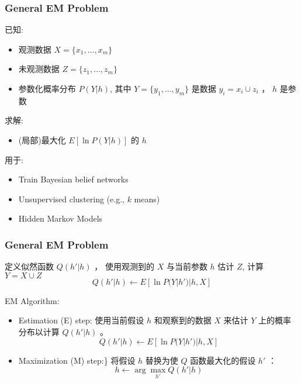 \documentclass{beamer}
\begin{document}
\begin{frame}
\frametitle{General  EM Problem}
\label{sec-9-7}


已知:
\begin{itemize}
\item 观测数据 $X=\{x_1, \ldots, x_m\}$
\item 未观测数据 $Z=\{z_1, \dots, z_m\}$
\item 参数化概率分布 $P(Y|h)$, 其中  $Y=\{y_1, \dots, y_m\}$ 是数据 $y_i = x_i \cup z_i$ ，  $h$ 是参数
\end{itemize}

求解:
\begin{itemize}
\item (局部)最大化 $E[\ln P(Y|h)]$ 的 $h$
\end{itemize}


用于:
\begin{itemize}
\item Train Bayesian belief networks
\item Unsupervised clustering (e.g., $k$ means)
\item Hidden Markov Models
\end{itemize}
\end{frame}
\begin{frame}
\frametitle{General  EM Problem}
\label{sec-9-8}

定义似然函数 $Q(h' | h)$ ， 使用观测到的 $X$ 与当前参数 $h$ 估计 $Z$, 计算 $Y = X \cup Z$
$$Q(h' | h) \leftarrow E[ \ln P(Y | h') | h, X ]$$

EM Algorithm:

\begin{itemize}
\item Estimation (E) step: 
    使用当前假设 $h$ 和观察到的数据 $X$ 来估计 $Y$ 上的概率分布以计算 $Q(h'|h)$ 。
    $$Q(h' | h) \leftarrow E[ \ln P(Y | h') | h, X ]$$
\item Maximization (M) step:\} 
    将假设 $h$ 替换为使 $Q$ 函数最大化的假设 $h'$ ：
    $$h \leftarrow \arg \max_{h'}  Q(h' | h)$$
\end{itemize}
\end{frame}
\end{document}
